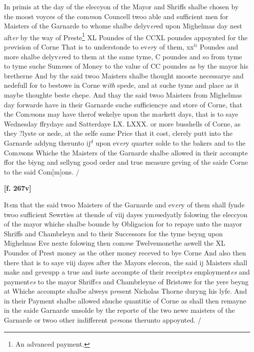\documentclass[a4paper,12pt]{article}
\begin{document}
In primis at the day of the eleccyon of the Mayor and Shriffs shalbe chosen by the moost voyces of the com\textit{m}on Councell twoo able and sufficient men for Maisters of the Garnarde to whome shalbe delyv\textit{er}ed upon Mighelmas day nest aft\textit{er} by the way of Preste\footnote{An advanced payment.} XL Poundes of the CCXL poundes appoynted for the p\textit{ro}vision of Corne  That is to understonde to ev\textit{er}y of them, xx$^{ti}$ Poundes and more shalbe delyv\textit{er}ed to them at the same tyme, C poundes and so from tyme to tyme suche Sum\textit{m}es of Money to the value of CC poundes as by the mayor his bretherne And by the said twoo Maisters shalbe thought mooste necessarye and nedefull for to bestowe in Corne w\textit{ith} spede, and at suche tyme and place as it maybe thoughte beste chepe. And thay the said twoo Maisters from Mighelmas day forwarde have in their Garnarde suche sufficiencye and store of Corne, that the Com\textit{m}ons may have therof wekelye upon the m\textit{ar}kett days, that is to saye Wednesday ffrydaye and Satterdaye LX. LXXX. or more busshells of Corne, as they ?lyste or nede, at the selfe same Price that it cost, clerely putt into the Garnarde addyng therunto ij$^{d}$ upon ev\textit{er}y quarter solde to the bakers and to the Com\textit{m}ons Whiche the Maisters of the Garnarde shalbe allowed in their accompte ffor the biyng and sellyng good order and true measure geving of the saide Corne to the said Com[m]ons. /

\textbf{[f. 267v]}

It\textit{e}m that the said twoo Maisters of the Garnarde and ev\textit{er}y of them shall fynde twoo sufficient Sewrties at thende of viij dayes ym\textit{m}edyatly folowing the eleccyon of the mayor whiche shalbe bounde by Obligacion for to repaye unto the mayor Shriffs and Chambrleyn and to their Successors for the tyme beyng upon Mighelmas Eve nexte folowing then com\textit{m}e Twelvemonethe aswell the XL Poundes of Prest money as the other money receved to bye Corne And also then there that is to saye viij dayes after the Mayors eleccon, the said ij Maisters shall make and geveupp a true and iuste accompte of their receipt\textit{es} employment\textit{es} and payment\textit{es} to the mayor Shriff\textit{es} and Chambrleyne of Bristowe for the yere beyng at Whiche accompte shalbe alweys p\textit{re}sent Nicholas Thorne duryng his lyfe. And in their Payment shalbe allowed shuche quantitie of Corne as shall then remayne in the saide Garnarde unsolde by the reporte of the two newe maisters of the Garnarde or twoo other indifferent p\textit{er}sons therunto appoynted. /
\end{document}
